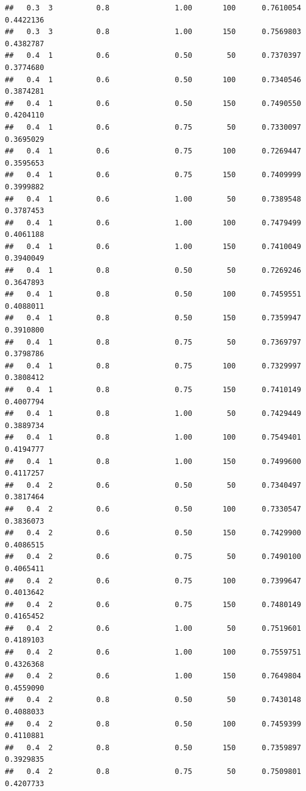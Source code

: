 \documentclass[
]{book}
\theoremstyle{break}
\theoremstyle{definition}
\theoremstyle{definition}
\theoremstyle{definition}
\theoremstyle{remark}
\begin{document}
\begin{verbatim}
##   0.3  3          0.8               1.00       100      0.7610054  0.4422136
##   0.3  3          0.8               1.00       150      0.7569803  0.4382787
##   0.4  1          0.6               0.50        50      0.7370397  0.3774680
##   0.4  1          0.6               0.50       100      0.7340546  0.3874281
##   0.4  1          0.6               0.50       150      0.7490550  0.4204110
##   0.4  1          0.6               0.75        50      0.7330097  0.3695029
##   0.4  1          0.6               0.75       100      0.7269447  0.3595653
##   0.4  1          0.6               0.75       150      0.7409999  0.3999882
##   0.4  1          0.6               1.00        50      0.7389548  0.3787453
##   0.4  1          0.6               1.00       100      0.7479499  0.4061188
##   0.4  1          0.6               1.00       150      0.7410049  0.3940049
##   0.4  1          0.8               0.50        50      0.7269246  0.3647893
##   0.4  1          0.8               0.50       100      0.7459551  0.4088011
##   0.4  1          0.8               0.50       150      0.7359947  0.3910800
##   0.4  1          0.8               0.75        50      0.7369797  0.3798786
##   0.4  1          0.8               0.75       100      0.7329997  0.3808412
##   0.4  1          0.8               0.75       150      0.7410149  0.4007794
##   0.4  1          0.8               1.00        50      0.7429449  0.3889734
##   0.4  1          0.8               1.00       100      0.7549401  0.4194777
##   0.4  1          0.8               1.00       150      0.7499600  0.4117257
##   0.4  2          0.6               0.50        50      0.7340497  0.3817464
##   0.4  2          0.6               0.50       100      0.7330547  0.3836073
##   0.4  2          0.6               0.50       150      0.7429900  0.4086515
##   0.4  2          0.6               0.75        50      0.7490100  0.4065411
##   0.4  2          0.6               0.75       100      0.7399647  0.4013642
##   0.4  2          0.6               0.75       150      0.7480149  0.4165452
##   0.4  2          0.6               1.00        50      0.7519601  0.4189103
##   0.4  2          0.6               1.00       100      0.7559751  0.4326368
##   0.4  2          0.6               1.00       150      0.7649804  0.4559090
##   0.4  2          0.8               0.50        50      0.7430148  0.4088033
##   0.4  2          0.8               0.50       100      0.7459399  0.4110881
##   0.4  2          0.8               0.50       150      0.7359897  0.3929835
##   0.4  2          0.8               0.75        50      0.7509801  0.4207733

\end{verbatim}
\end{document}
